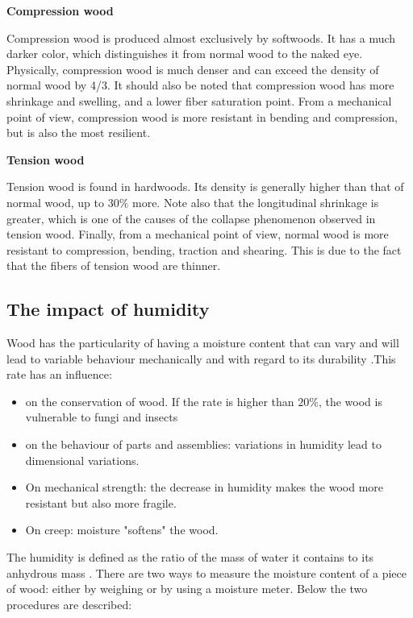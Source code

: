 \smallskip

\textbf{Compression wood}

Compression wood is produced almost exclusively by softwoods. It has a much darker color, which distinguishes it from normal wood to the naked eye. Physically, compression wood is much denser and can exceed the density of normal wood by 4/3. It should also be noted that compression wood has more shrinkage and swelling, and a lower fiber saturation point. From a mechanical point of view, compression wood is more resistant in bending and compression, but is also the most resilient.

\smallskip

\textbf{Tension wood}

Tension wood is found in hardwoods. Its density is generally higher than that of normal wood, up to $30 \%$ more. Note also that the longitudinal shrinkage is greater, which is one of the causes of the collapse phenomenon observed in tension wood. Finally, from a mechanical point of view, normal wood is more resistant to compression, bending, traction and shearing. This is due to the fact that the fibers of tension wood are thinner.

\subsection{The impact of humidity}

Wood has the particularity of having a moisture content that can vary and will lead to variable behaviour mechanically and with regard to its durability \cite{Taazount2021}.This rate has an influence: 

\begin{itemize}
	\item on the conservation of wood. If the rate is higher than $20 \%$, the wood is vulnerable to fungi and insects
	\item on the behaviour of parts and assemblies: variations in humidity lead to dimensional variations.
	\item On mechanical strength: the decrease in humidity makes the wood more resistant but also more fragile.
	\item On creep: moisture "softens" the wood.
\end{itemize}

The humidity is defined as the ratio of the mass of water it contains to its anhydrous mass \cite{Nguyen2016phd}. There are two ways to measure the moisture content of a piece of wood: either by weighing or by using a moisture meter. Below the two procedures are described:

